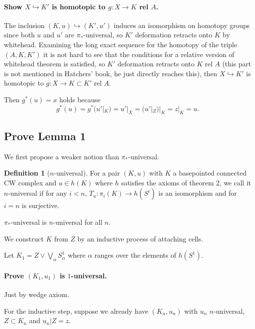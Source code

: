 \documentclass[11pt, oneside]{article}   	%
\theoremstyle{definition}
\newtheorem*{defn}{Definition}
\begin{document}
\paragraph {Show $X\hookrightarrow K'$ is homotopic to $g: X\to K$ rel $A$.} The inclusion $(K, u)\hookrightarrow (K', u')$ induces an isomorphism on homotopy groups since both $u$ and $u'$ are $\pi_*$-universal, so $K'$ deformation retracts onto $K$ by whitehead. Examining the long exact sequence for the homotopy of the triple $(A, K, K')$ it is not hard to see that the conditions for a relative version of whitehead theorem is satisfied, so $K'$ deformation retracts onto $K$ rel $A$ (this part is not mentioned in Hatchers' book, he just directly reaches this), then $X\hookrightarrow K'$ is homotopic to $g: X\to K\subset K'$ rel $A$.

Then $g^*(u)=x$ holds because
\begin{equation}
	g^*(u)=g^*(u'|_K)=u'|_X=(u'|_Z)|_K=z|_K=u.
\end{equation}

\subsection{Prove Lemma 1}

We first propose a weaker notion than $\pi_*$-universal.

\begin{defn}[$n$-universal]
	For a pair $(K, u)$ with $K$ a basepointed connected CW complex and $u\in h(K)$ where $h$ satisfies the axioms of theorem 2, we call it $n$-universal if for any $i<n$, $T_u: \pi_i(K)\to h(S^i)$ is an isomorphism and for $i=n$ is surjective.
\end{defn}

\begin{rmk}
	$\pi_*$-universal is $n$-universal for all $n$.
\end{rmk}

We construct $K$ from $Z$ by an inductive process of attaching cells.

Let $K_1=Z\vee\bigvee_\alpha S^1_\alpha$ where $\alpha$ ranges over the elements of $h(S^1)$.

\paragraph{Prove $(K_1, u_1)$ is $1$-universal.} Just by wedge axiom.

For the inductive step, suppose we already have $(K_n, u_n)$ with $u_n$ $n$-universal, $Z\subset K_n$ and $u_n|Z=z$.
\end{document}
